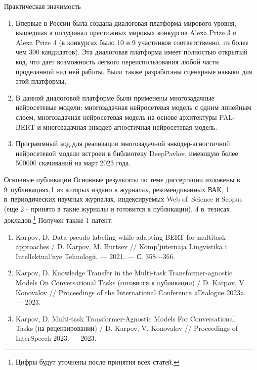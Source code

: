 \begin{frame}{Практическая значимость}
\begin{enumerate}
   \item Впервые в России была создана диалоговая платформа мирового уровня, вышедшая в полуфинал престижных мировых конкурсов Alexa Prize 3 и Alexa Prize 4 (в конкурсах было 10 и 9 участников соответственно, из более чем 300 кандидатов). Эта диалоговая платформа имеет полностью открытый код, что дает возможность легкого переиспользования любой части проделанной над ней работы. Были также разработаны сценарные навыки для этой платформы.
   \item В данной диалоговой платформе были применены многозадачные нейросетевые модели: многозадачная нейросетевая модель с одним линейным слоем, многозадачная нейросетевая модель на основе архитектуры PAL-BERT и многозадачная энкодер-агностичная нейросетевая модель.
   \item Программный код для реализации многозадачной энкодер-агностичной нейросетевой модели встроен в библиотеку DeepPavlov, имеющую более 500000 скачиваний на март 2023 года.
\end{enumerate}    
\end{frame}

\begin{frame}{Основные публикации}
 Основные результаты по теме диссертации изложены в 9~публикациях,{1} из которых издано в журналах, рекомендованных ВАК, {1} в~периодических научных журналах, индексируемых Web of~Science и Scopus (еще 2 - принято в такие журналы и готовится к публикации), {4} в~тезисах докладов.\footnote{Цифры будут уточнены после принятия всех статей.} Получен также 1 патент.
 \newline
\begin{enumerate}
 \item Karpov, D. Data pseudo-labeling while adapting BERT for multitask
approaches  / D. Karpov, M. Burtsev // Komp’juternaja
Lingvistika i Intellektual’nye Tehnologii. — 2021. — С. 358—366.
\item  Karpov, D. Knowledge Transfer in the Multi-task Transformer-agnostic
Models On Conversational Tasks (готовится к публикации) /
D. Karpov, V. Konovalov // Proceedings of the International Conference
«Dialogue 2023». — 2023.
\item Karpov, D. Multi-task Transformer-Agnostic Models For Conversational
Tasks (на рецензировании) / D. Karpov, V. Konovalov //
Proceedings of InterSpeech 2023. — 2023.
\end{enumerate}
\end{frame}

